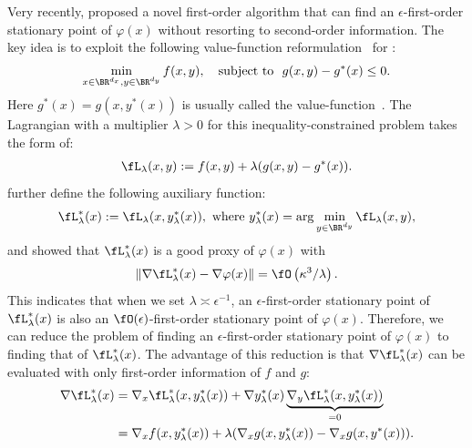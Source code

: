 \documentclass{article}
\begin{document}
Very recently,  \citet{kwon2023fully}  proposed a novel first-order algorithm that can find an $\epsilon$-first-order stationary point of $\varphi(x)$ without resorting to second-order information.  
The key idea is to exploit the following value-function reformulation~\citep{outrata1990numerical,dempe2020bilevel,lin2014solving,gao2022value,ye2023difference} for :
\begin{align} \label{value-refo}
    \min_{x \in \BR^{d_x}, y \in \BR^{d_y}} f(x,y) , \quad {\rm subject ~to}~~ g(x,y) - g^*(x) \le 0.
\end{align}
Here $g^*(x) = g(x,y^*(x))$ is usually called the value-function~\citep{ye1995optimality,ye2010new,dempe2002foundations}. The 
Lagrangian with a multiplier $\lambda >0$ for this inequality-constrained problem takes the form of:
\begin{align} \label{eq:L}
    \fL_{\lambda}(x,y):= f(x,y)+ \lambda ( g(x,y) - g^*(x)).
\end{align}
\citet{kwon2023fully} further define the following auxiliary function:
\begin{align}\label{eq:L-lambda}
\begin{split}
     \fL_{\lambda}^*(x) := \fL_{\lambda}(x,y_{\lambda}^*(x)),~
     {\rm where }~ y_{\lambda}^*(x) = \arg \min_{y \in \BR^{d_y}} \fL_{\lambda}(x,y),
\end{split}
\end{align}
and showed that $\fL_{\lambda}^*(x)$ is a good proxy of $\varphi(x)$ with
\begin{align*}
    \Vert \nabla \fL_{\lambda}^*(x) - \nabla \varphi(x)  \Vert = \fO \left( \kappa^3 /\lambda \right).
\end{align*}
This indicates that when we set $\lambda \asymp \epsilon^{-1}$, an $\epsilon$-first-order stationary point of $\fL_{\lambda}^*(x)$ is also an $\fO(\epsilon)$-first-order stationary point of $\varphi(x)$. Therefore, we
can reduce the problem of finding an $\epsilon$-first-order stationary point of $\varphi(x)$ to finding that of $\fL_{\lambda}^*(x)$.
The advantage of this reduction is that 
 $\nabla \fL_{\lambda}^*(x)$ can be evaluated with only first-order information of $f$ and $g$:
 \begin{align} \label{eq:nabla-Lag}
 \begin{split}
     \nabla \fL_{\lambda}^*(x) &= 
     \nabla_x \fL_{\lambda}^*(x,y_{\lambda}^*(x)) + \nabla y_{\lambda}^*(x) \underbrace{\nabla_y \fL_{\lambda}^*(x,y_{\lambda}^*(x))}_{=0} 
     \\
     &=\nabla_x f(x, y_{\lambda}^*(x)) + \lambda ( \nabla_x g(x,y_{\lambda}^*(x)) - \nabla_x g(x,y^*(x))).
 \end{split}
 \end{align}
\end{document}
